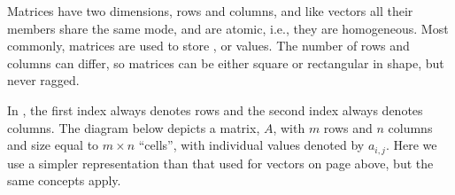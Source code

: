 \documentclass[krantz2]{krantz}\usepackage{knitr}
\begin{document}
Matrices have two dimensions, rows and columns, and like vectors all their members share the same mode, and are atomic, i.e., they are homogeneous. Most commonly, matrices are used to store ,  or  values. The number of rows and columns can differ, so matrices can be either square or rectangular in shape, but never ragged.

In \Rlang, the first index always denotes rows and the second index always denotes columns. The diagram below depicts a matrix, $A$, with $m$ rows and $n$ columns and size equal to $m \times n$ ``cells'', with individual values denoted by $a_{i,j}$. Here we use a simpler representation than that used for vectors on page \pageref{par:calc:vectors:diag} above, but the same concepts apply.

\begin{center}
\begin{small}
\end{small}
\end{center}
\end{document}
